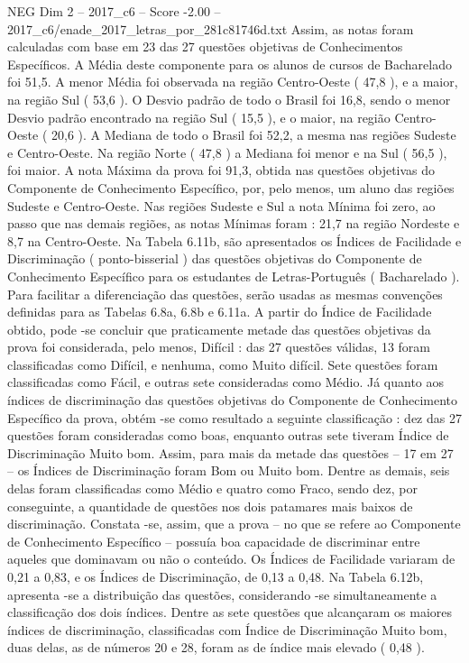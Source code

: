 \begin{textsample}{NEG Dim 2 – 2017\_c6 – Score -2.00 – 2017\_c6/enade\_2017\_letras\_por\_281c81746d.txt}
Assim, as notas foram calculadas com base em 23 das 27 questões objetivas de Conhecimentos Específicos.
A Média deste componente para os alunos de cursos de Bacharelado foi 51,5.
A menor Média foi observada na região Centro-Oeste ( 47,8 ), e a maior, na região Sul ( 53,6 ).
O Desvio padrão de todo o Brasil foi 16,8, sendo o menor Desvio padrão encontrado na região Sul ( 15,5 ), e o maior, na região Centro-Oeste ( 20,6 ).
A Mediana de todo o Brasil foi 52,2, a mesma nas regiões Sudeste e Centro-Oeste.
Na região Norte ( 47,8 ) a Mediana foi menor e na Sul ( 56,5 ), foi maior.
A nota Máxima da prova foi 91,3, obtida nas questões objetivas do Componente de Conhecimento Específico, por, pelo menos, um aluno das regiões Sudeste e Centro-Oeste.
Nas regiões Sudeste e Sul a nota Mínima foi zero, ao passo que nas demais regiões, as notas Mínimas foram : 21,7 na região Nordeste e 8,7 na Centro-Oeste.
Na Tabela 6.11b, são apresentados os Índices de Facilidade e Discriminação ( ponto-bisserial ) das questões objetivas do Componente de Conhecimento Específico para os estudantes de Letras-Português ( Bacharelado ).
Para facilitar a diferenciação das questões, serão usadas as mesmas convenções definidas para as Tabelas 6.8a, 6.8b e 6.11a.
A partir do Índice de Facilidade obtido, pode -se concluir que praticamente metade das questões objetivas da prova foi considerada, pelo menos, Difícil : das 27 questões válidas, 13 foram classificadas como Difícil, e nenhuma, como Muito difícil.
Sete questões foram classificadas como Fácil, e outras sete consideradas como Médio.
Já quanto aos índices de discriminação das questões objetivas do Componente de Conhecimento Específico da prova, obtém -se como resultado a seguinte classificação : dez das 27 questões foram consideradas como boas, enquanto outras sete tiveram Índice de Discriminação Muito bom.
Assim, para mais da metade das questões – 17 em 27 – os Índices de Discriminação foram Bom ou Muito bom.
Dentre as demais, seis delas foram classificadas como Médio e quatro como Fraco, sendo dez, por conseguinte, a quantidade de questões nos dois patamares mais baixos de discriminação.
Constata -se, assim, que a prova – no que se refere ao Componente de Conhecimento Específico – possuía boa capacidade de discriminar entre aqueles que dominavam ou não o conteúdo.
Os Índices de Facilidade variaram de 0,21 a 0,83, e os Índices de Discriminação, de 0,13 a 0,48.
Na Tabela 6.12b, apresenta -se a distribuição das questões, considerando -se simultaneamente a classificação dos dois índices.
Dentre as sete questões que alcançaram os maiores índices de discriminação, classificadas com Índice de Discriminação Muito bom, duas delas, as de números 20 e 28, foram as de índice mais elevado ( 0,48 ).

\end{textsample}
